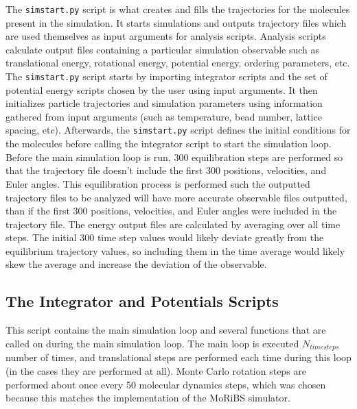 \documentclass{ece}
\begin{document}
The \texttt{simstart.py} script is what creates and fills the trajectories for the molecules present in the simulation. It starts simulations and outputs trajectory files which are used themselves as input arguments for analysis scripts. Analysis scripts calculate output files containing a particular simulation observable such as translational energy, rotational energy, potential energy, ordering parameters, etc. The \texttt{simstart.py} script starts by importing integrator scripts and the set of potential energy scripts chosen by the user using input arguments. It then initializes particle trajectories and simulation parameters using information gathered from input arguments (such as temperature, bead number, lattice spacing, etc). Afterwards, the \texttt{simstart.py} script defines the initial conditions for the molecules before calling the  integrator script to start the simulation loop. Before the main simulation loop is run, 300 equilibration steps are performed so that the trajectory file doesn't include the first 300 positions, velocities, and Euler angles. This equilibration process is performed such the outputted trajectory files to be analyzed will have more accurate observable files outputted, than if the first 300 positions, velocities, and Euler angles were included in the trajectory file. The energy output files are calculated by averaging over all time steps. The initial 300 time step values would likely deviate greatly from the equilibrium trajectory values, so including them in the time average would likely skew the average and increase the deviation of the observable. 

\subsection{The Integrator and Potentials Scripts}

This script contains the main simulation loop and several functions that are called on during the main simulation loop. The main loop is executed \begin{math} N_{timesteps} \end{math} number of times, and translational steps are performed each time during this loop (in the cases they are performed at all). Monte Carlo rotation steps are performed about once every 50 molecular dynamics steps, which was chosen because this matches the implementation of the \gls{MoRiBS} simulator. 
\end{document}
